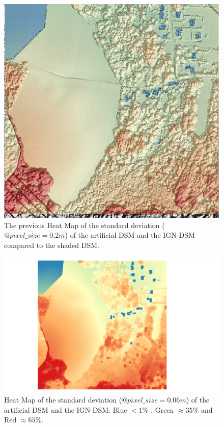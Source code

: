\documentclass[a4paper, 11pt]{article}
\begin{document}
	\begin{figure}[H]
		\begin{center}
			\caption{\label{img::heatmap_shading} The previous Heat Map of the standard deviation ($@ pixel\_size=0.2m$) of the artificial DSM and the IGN-DSM compared to the shaded DSM.}
			\includegraphics[scale=.4]{images/raster/elancourt/shaded_dsm_heat.png}
		\end{center}
	\end{figure}
	
	\begin{figure}[H]
		\begin{center}
			\caption{\label{img::heatmap_06} Heat Map of the standard deviation ($@ pixel\_size=0.06m$) of the artificial DSM and the IGN-DSM: Blue $< 1\%$ , Green $\approx 35\%$ and Red $\approx 65\%$.}
			\includegraphics[scale=.4]{images/raster/elancourt/heat_map_06.png}
		\end{center}
	\end{figure}
	
\end{document}
